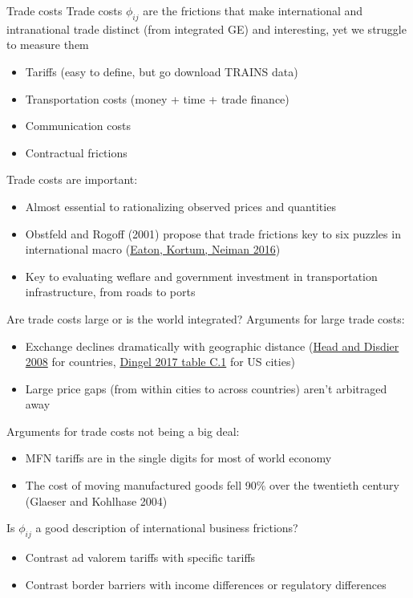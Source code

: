 \documentclass[10pt,notes=hide]{beamer}
\begin{document}
\begin{frame}{Trade costs}
Trade costs $\phi_{ij}$ are the frictions that make international and intranational trade distinct (from integrated GE) and interesting, yet we struggle to measure them
\begin{itemize}
	\item Tariffs (easy to define, but go download TRAINS data)
	\item Transportation costs (money + time + trade finance)
	\item Communication costs
	\item Contractual frictions
\end{itemize}
Trade costs are important:
\begin{itemize}
	\item Almost essential to rationalizing observed prices and quantities
	\item Obstfeld and Rogoff (2001) propose that trade frictions key to six puzzles in international macro (\href{https://www.sciencedirect.com/science/article/pii/S0165188916301014}{Eaton, Kortum, Neiman 2016})
	\item Key to evaluating weflare and government investment in transportation infrastructure, from roads to ports
\end{itemize}
\end{frame}
\begin{frame}{Are trade costs large or is the world integrated?}
Arguments for large trade costs:
\begin{itemize}
	\item Exchange declines dramatically with geographic distance ({\small \href{https://www.mitpressjournals.org/doi/10.1162/rest.90.1.37}{Head and Disdier 2008} for countries, \href{http://faculty.chicagobooth.edu/jonathan.dingel/research/thedeterminantsofqualityspecialization.pdf}{Dingel 2017 table C.1} for US cities})
	\item Large price gaps (from within cities to across countries) aren't arbitraged away
\end{itemize}
Arguments for trade costs not being a big deal:
\begin{itemize}
	\item MFN tariffs are in the single digits for most of world economy
	\item The cost of moving manufactured goods fell 90\% over the twentieth century (Glaeser and Kohlhase 2004)
\end{itemize}
Is $\phi_{ij}$ a good description of international business frictions?
\begin{itemize}
	\item Contrast ad valorem tariffs with specific tariffs
	\item Contrast border barriers with income differences or regulatory differences
\end{itemize}
\end{frame}
\end{document}
